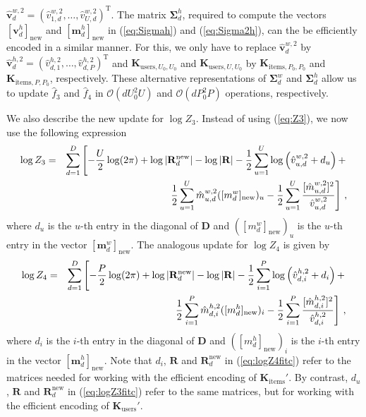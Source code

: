 \documentclass{article}
\begin{document}
$\hat{\mathbf{v}}_d^{w,2}=(\hat{v}_{1,d}^{w,2},\ldots,\hat{v}_{U,d}^{w,2})^\text{T}$.
The matrix $\bm \Sigma_d^h $, required to compute the vectors $[\mathbf{v}_{d}^{h}]_\text{new}$ and $[\mathbf{m}_{d}^{h}]_\text{new}$
in (\ref{eq:Sigmah}) and (\ref{eq:Sigma2h}), can the be efficiently encoded in a similar manner.
For this, we only have to replace $\hat{\mathbf{v}}_d^{w,2}$
by $\hat{\mathbf{v}}_d^{h,2}=(\hat{v}_{d,1}^{h,2},\ldots,\hat{v}_{d,P}^{h,2})^\text{T}$ and
$\mathbf{K}_{\text{users},U_0,U_0}$ and $\mathbf{K}_{\text{users},U,U_0}$ by
$\mathbf{K}_{\text{items},P_0,P_0}$ and $\mathbf{K}_{\text{items},P,P_0}$, respectively.
These alternative representations of $\bm \Sigma_d^w$ and $\bm \Sigma_d^h$ allow us to
update $\hat{f}_3$ and $\hat{f}_4$ in $\mathcal{O}(dU_0^2U)$ and $\mathcal{O}(dP_0^2P)$ operations, respectively.

We also describe the new update for $\log Z_3$. Instead of using (\ref{eq:Z3}), we now use the following expression
\begin{eqnarray}
\log Z_3 & = & \sum_{d=1}^D \left[ -\frac{U}{2} \log(2 \pi) +
\log|\mathbf{R}^\text{new}_d| - \log|\mathbf{R}| - 
\frac{1}{2} \sum_{u=1}^U \log \left(\hat{v}_{u,d}^{w,2} + d_u \right) + \right. \notag\\
& & \left. \frac{1}{2} \sum_{u=1}^U \hat{m}_{u,d}^{w,2} ([m_{d}^{w}]_\text{new})_u -
\frac{1}{2} \sum_{u=1}^U \frac{[\hat{m}_{u,d}^{w,2}]^2}{\hat{v}_{u,d}^{w,2}}\right]\,,\label{eq:logZ3fitc}
\end{eqnarray}
where $d_u$ is the $u$-th entry in the diagonal of $\mathbf{D}$ and $([m_{d}^{w}]_\text{new})_u$
is the $u$-th entry in the vector $[\mathbf{m}_{d}^{w}]_\text{new}$.
The analogous update for $\log Z_4$ is given by
\begin{eqnarray}
\log Z_4 & = & \sum_{d=1}^D \left[ -\frac{P}{2} \log(2 \pi) +
\log|\mathbf{R}^\text{new}_d| - \log|\mathbf{R}| - 
\frac{1}{2} \sum_{i=1}^P \log \left(\hat{v}_{d,i}^{h,2} + d_i\right) + \right. \notag\\
& & \left. \frac{1}{2} \sum_{i=1}^P \hat{m}_{d,i}^{h,2} ([m_{d}^{h}]_\text{new})_i -
\frac{1}{2} \sum_{i=1}^P \frac{[\hat{m}_{d,i}^{h,2}]^2}{\hat{v}_{d,i}^{h,2}}\right]\,,\label{eq:logZ4fitc}
\end{eqnarray}
where $d_i$ is the $i$-th entry in the diagonal of $\mathbf{D}$ and $([m_{d}^{h}]_\text{new})_i$
is the $i$-th entry in the vector $[\mathbf{m}_{d}^{h}]_\text{new}$.
Note that $d_i$, $\mathbf{R}$ and $\mathbf{R}^\text{new}_d$ in (\ref{eq:logZ4fitc}) refer to the matrices needed
for working with the efficient encoding of
$\mathbf{K}_\text{items}'$. By contrast, $d_u$, $\mathbf{R}$ and $\mathbf{R}^\text{new}_d$ in (\ref{eq:logZ3fitc}) 
refer to the same matrices, but for working with the efficient encoding of $\mathbf{K}_\text{users}'$.
\end{document}
